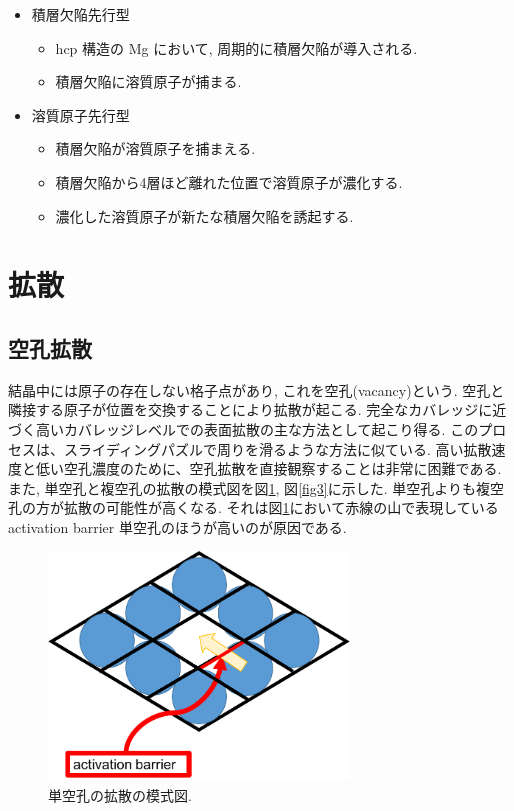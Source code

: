 \begin{itemize}
 \item 積層欠陥先行型
    \begin{itemize}
      \item hcp 構造の Mg において, 周期的に積層欠陥が導入される.
      \item 積層欠陥に溶質原子が捕まる.
     \end{itemize}
 \item 溶質原子先行型
 \begin{itemize}
      \item 積層欠陥が溶質原子を捕まえる.
      \item 積層欠陥から4層ほど離れた位置で溶質原子が濃化する.
	　\item 濃化した溶質原子が新たな積層欠陥を誘起する.
     \end{itemize}

\end{itemize}

\section{拡散}
\subsection{空孔拡散}
結晶中には原子の存在しない格子点があり, これを空孔(vacancy)という. 空孔と隣接する原子が位置を交換することにより拡散が起こる.
完全なカバレッジに近づく高いカバレッジレベルでの表面拡散の主な方法として起こり得る. このプロセスは、スライディングパズルで周りを滑るような方法に似ている. 高い拡散速度と低い空孔濃度のために、空孔拡散を直接観察することは非常に困難である. また, 単空孔と複空孔の拡散の模式図を図\ref{fig2}, 図\ref{fig3}に示した. 単空孔よりも複空孔の方が拡散の可能性が高くなる. それは図\ref{fig2}において赤線の山で表現している activation barrier 単空孔のほうが高いのが原因である.

\begin{figure}[htbp]
	\begin{center}
		\includegraphics[width=80mm]{../intro/monovacancy.png}
        \caption{単空孔の拡散の模式図.}
		\label{fig2}
	\end{center}
\end{figure}

